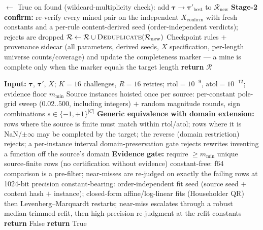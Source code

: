 \documentclass[10pt]{article}
\newcommand{\R}{\mathcal{R}}
\newcommand{\ttau}{\bm{\tau}}
\begin{document}
\begin{algorithm}[H]
\begin{algorithmic}[1]
                       $\gets$ True
            \EndIf
        \EndFor
        \State on found (wildcard-multiplicity check): add
               $\ttau \to \ttau'_{\mathrm{best}}$ to $\R_{\mathrm{new}}$
    \EndFor
    \State \textbf{Stage-2 confirm:} re-verify every mined pair on the independent
    $X_{\mathrm{confirm}}$ with fresh constants and a per-rule content-derived seed
    (order-independent verdicts); rejects are dropped
    \State $\R \gets \R \cup \textsc{Deduplicate}(\R_{\mathrm{new}})$
    \State Checkpoint rules $+$ provenance sidecar (all parameters, derived seeds, $X$
    specification, per-length universe counts/coverage) and update the completeness
    marker --- a mine is complete only when the marker equals the target length
\EndFor
\State \textbf{return} $\R$
\end{algorithmic}
\end{algorithm}

\begin{algorithm}[H]
\caption{Expression Equivalence Check ($\mathrm{Equivalent}^{+}$)}
\begin{algorithmic}[1]
\State \textbf{Input:} $\ttau$, $\ttau'$, $X$; $K{=}16$ challenges, $R{=}16$ retries;
$\mathrm{rtol}=10^{-9}$, $\mathrm{atol}=10^{-12}$; evidence floor $m_{\min}$
\State Source instances hoisted once per source: per-constant pole-grid sweep
($0.02..500$, including integers) $+$ random magnitude rounds, sign combinations
$s \in \{-1,+1\}^{|C|}$
    \State \textbf{Generic equivalence with domain extension:} rows where the source is
    finite must match within rtol/atol; rows where it is NaN/$\pm\infty$ may be completed
    by the target; the reverse (domain restriction) rejects; a per-instance interval
    domain-preservation gate rejects rewrites inventing a function off the source's
    domain
    \State \textbf{Evidence gate:} require $\ge m_{\min}$ unique source-finite rows
    (no certification without evidence)
    \State constant-free: f64 comparison is a pre-filter; near-misses are re-judged on
    exactly the failing rows at 1024-bit precision
    \State constant-bearing: order-independent fit seed (source seed $+$ content hash
    $+$ instance); closed-form affine/log-linear fits (Householder QR) then
    Levenberg--Marquardt restarts; near-miss escalates through a robust median-trimmed
    refit, then high-precision re-judgment at the refit constants
     \State \textbf{return} False \EndIf
\EndFor
\State \textbf{return} True
\end{algorithmic}
\end{algorithm}
\end{document}
